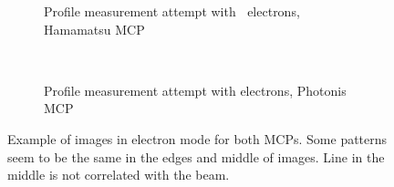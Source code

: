 \begin{figure}[!ht]
	\begin{subfigure}[t]{0.5\textwidth}
		
		\caption{Profile measurement attempt with $\ $ electrons, Hamamatsu MCP}
		\label{}
	\end{subfigure}
	~
	\begin{subfigure}[t]{0.5\textwidth}
		
		\caption{Profile measurement attempt with electrons, Photonis MCP}
		\label{}
	\end{subfigure}
	\caption[Example of images in electron mode]{Example of images in electron mode for both MCPs.
  Some patterns seem to be the same in the edges and middle of images.
  Line in the middle is not correlated with the beam.}
	\label{chap4:electron_MCP}
\end{figure}